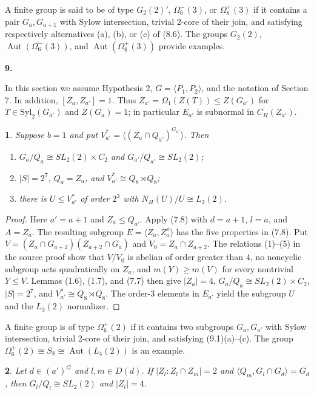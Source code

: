\documentclass[11pt]{article}
\theoremstyle{plain}
\theoremstyle{stmplain}
\newtheorem{stm}{}[section]
\newcommand{\sect}[1]{\stepcounter{section}\par\vspace{14pt}%
  \begin{center}\textbf{#1.}\end{center}\vspace{2pt}}
\begin{document}
\noindent A finite group is said to be of type $G_2(2)'$, $\Omega_6^-(3)$, or
$\Omega_8^+(3)$ if it contains a pair $G_a,G_{a+1}$ with Sylow intersection,
trivial 2-core of their join, and satisfying respectively alternatives
(a), (b), or (c) of (8.6). The groups $G_2(2)$,
$\operatorname{Aut}(\Omega_6^-(3))$, and
$\operatorname{Aut}(\Omega_8^+(3))$ provide examples.

\sect{9}

\noindent In this section we assume Hypothesis 2,
$G=\langle P_1,P_2\rangle$, and the notation of Section 7. In addition,
$[Z_a,Z_{a'}]=1$. Thus $Z_{a'}=\Omega_1(Z(T))\le Z(G_{a'})$ for
$T\in\mathrm{Syl}_2(G_{a'})$ and $Z(G_a)=1$; in particular
$E_{a'}$ is subnormal in $C_H(Z_{a'})$.

\begin{stm}\label{st:9.1}
Suppose $b=1$ and put
$V_{a'}^*=\langle (Z_a\cap Q_{a'})^{G_{a'}}\rangle$. Then
\begin{enumerate}
\item[(a)] $G_a/Q_a\cong SL_2(2)\times C_2$ and
  $G_{a'}/Q_{a'}\cong SL_2(2)$;
\item[(b)] $|S|=2^7$, $Q_a=Z_a$, and
  $V_{a'}^*\cong Q_8\rtimes Q_8$;
\item[(c)] there is $U\le V_{a'}^*$ of order $2^3$ with
  $N_H(U)/U\cong L_3(2)$.
\end{enumerate}
\end{stm}

\begin{proof}
Here $a'=a+1$ and $Z_a\le Q_{a'}$. Apply (7.8) with
$d=a+1$, $l=a$, and $A=Z_a$. The resulting subgroup
$E=\langle Z_a,Z_a^x\rangle$ has the five properties in (7.8).
Put $V=(Z_a\cap G_{a+2})(Z_{a+2}\cap G_a)$ and
$V_0=Z_a\cap Z_{a+2}$. The relations (1)--(5) in the source proof show
that $V/V_0$ is abelian of order greater than $4$, no noncyclic subgroup
acts quadratically on $Z_a$, and $m(Y)\ge m(V)$ for every nontrivial
$Y\le V$. Lemmas (1.6), (1.7), and (7.7) then give
$|Z_a|=4$, $G_a/Q_a\cong SL_2(2)\times C_2$,
$|S|=2^7$, and $V_{a'}^*\cong Q_8\rtimes Q_8$. The order-$3$ elements
in $E_{a'}$ yield the subgroup $U$ and the $L_3(2)$ normalizer.
\end{proof}

\noindent A finite group is of type $\Omega_6^+(2)$ if it contains two
subgroups $G_a,G_{a'}$ with Sylow intersection, trivial 2-core of their
join, and satisfying (9.1)(a)--(c). The group
$\Omega_6^+(2)\cong S_8\cong\operatorname{Aut}(L_4(2))$ is an example.

\begin{stm}\label{st:9.2}
Let $d\in(a')^G$ and $l,m\in D(d)$. If
$|Z_l:Z_l\cap Z_m|=2$ and
$\langle Q_m,G_l\cap G_d\rangle=G_d$, then
$G_l/Q_l\cong SL_2(2)$ and $|Z_l|=4$.
\end{stm}
\end{document}
